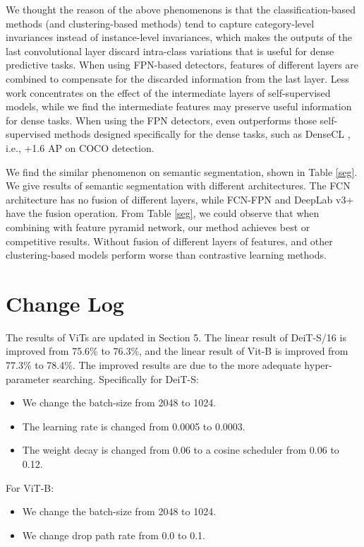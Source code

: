\documentclass[10pt,twocolumn,letterpaper]{article}
\begin{document}
We thought the reason of the above phenomenons is that the classification-based methods (\ourmethod and clustering-based methods) tend to capture category-level invariances instead of instance-level invariances, which makes the outputs of the last convolutional layer discard intra-class variations that is useful for dense predictive tasks. When using FPN-based detectors, features of different layers are combined to compensate for the discarded information from the last layer. Less work concentrates on the effect of the intermediate layers of self-supervised models, while we find the intermediate features may preserve useful information for dense tasks. When using the FPN detectors, \ourmethod even outperforms those self-supervised methods designed specifically for the dense tasks, such as DenseCL \cite{wang2020DenseCL}, i.e., +1.6 AP on COCO detection. 

We find the similar phenomenon on semantic segmentation, shown in Table \ref{seg}. We give results of semantic segmentation with different architectures. The FCN architecture has no fusion of different layers, while FCN-FPN and DeepLab v3+ have the fusion operation. From Table \ref{seg}, we could observe that when combining with feature pyramid network, our method achieves best or competitive results. Without fusion of different layers of features, \ourmethod and other clustering-based models perform worse than contrastive learning methods.
\section{Change Log}
The results of ViTs are updated in Section 5. The linear result of DeiT-S/16 is improved from 75.6\% to 76.3\%, and the linear result of Vit-B is improved from 77.3\% to 78.4\%. The improved results are due to the more adequate hyper-parameter searching. Specifically for DeiT-S:
\begin{itemize}
    \item We change the batch-size from 2048 to 1024.
    \item The learning rate is changed from 0.0005 to 0.0003.
    \item The weight decay is changed from 0.06 to a cosine scheduler from 0.06 to 0.12.
\end{itemize}
For ViT-B: 
\begin{itemize}
    \item We change the batch-size from 2048 to 1024.
    \item We change drop path rate from 0.0 to 0.1.
\end{itemize}
\end{document}
